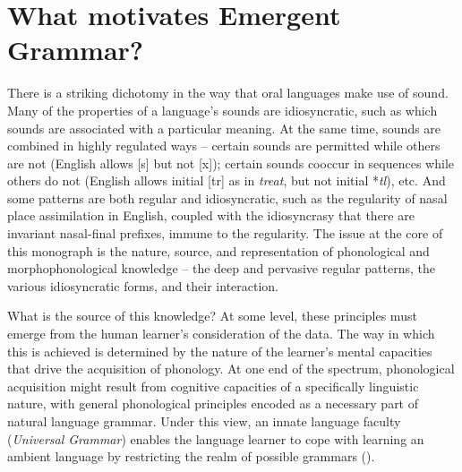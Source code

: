 \chapter{What motivates Emergent Grammar?}\label{intro_motivation}
\label{ch1} \label{section_cognition}
\largerpage[1.5]
There is a striking dichotomy in the way that oral languages make use of sound. Many of the properties of a language's sounds are idiosyncratic, such as which sounds are associated with a particular meaning. At the same time,  sounds are combined in highly regulated ways -- certain sounds are permitted while others are not (English allows [s] but not [x]); certain sounds cooccur in sequences while others do not  (English allows initial [tr] as in {\it treat}, but not initial *{\it tl}), etc. And some patterns are both regular and idiosyncratic, such as the regularity of nasal place assimilation in English, coupled with the idiosyncrasy that there are invariant nasal-final prefixes,  immune to the regularity. The issue at the core of this monograph is the nature, source, and representation of phonological and morphophonological knowledge -- the deep and pervasive regular patterns, the various idiosyncratic forms, and their interaction. 

What is the source of this knowledge?  At some level, these principles must emerge from the human learner's consideration of the data. The way in which this is achieved is determined by the nature of the learner's mental capacities that drive the acquisition of phonology. At one end of the spectrum, phonological acquisition might result from cognitive capacities of a specifically linguistic nature, with general phonological principles encoded as a necessary part of natural language grammar.  Under this view, an innate language faculty (\textit{Universal Grammar}) enables the language learner to cope with learning an ambient language by restricting the realm of possible grammars (\citealt{Chomsky+:1968}).

